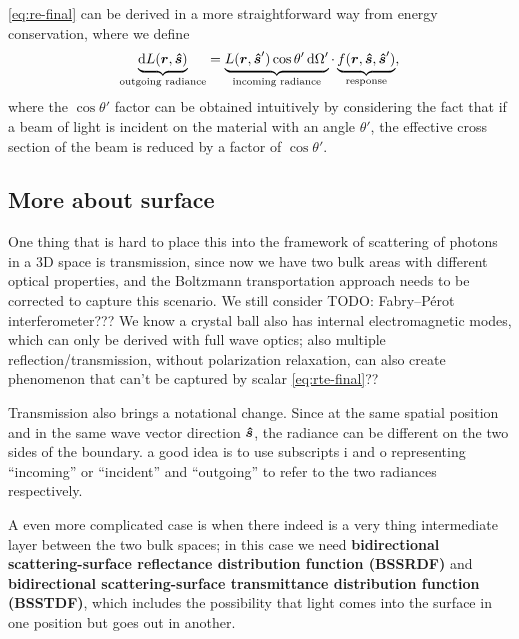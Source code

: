 \documentclass[hyperref, a4paper]{article}
\newcommand*{\concept}[1]{{\textbf{#1}}}
\begin{document}
\eqref{eq:re-final} can be derived in a more straightforward way 
from energy conservation, 
where we define 
\begin{equation}
    \underbrace{\dd{L(\vb*{r}, \vu*{s})}}_{\text{outgoing radiance}} 
    = \underbrace{L(\vb*{r}, \vu*{s}') \cos \theta' \dd{\Omega'}}_{\text{incoming radiance}} 
    \cdot \underbrace{f(\vb*{r}, \vu*{s}, \vu*{s}')}_{\text{response}} ,
\end{equation}
where the $\cos \theta'$ factor can be obtained intuitively 
by considering the fact that if a beam of light 
is incident on the material with an angle $\theta'$, 
the effective cross section of the beam is reduced by a factor of $\cos \theta'$.

\subsection{More about surface}


One thing that is hard to place this into the framework 
of scattering of photons in a 3D space
is transmission, 
since now we have two bulk areas with different optical properties,
and the Boltzmann transportation approach needs to be corrected 
to capture this scenario.
We still consider TODO: Fabry–Pérot interferometer??? We know a crystal ball also has internal electromagnetic modes, which can only be derived with full wave optics; 
also multiple reflection/transmission, 
without polarization relaxation,
can also create phenomenon that can't be captured by scalar \eqref{eq:rte-final}??

Transmission also brings a notational change. 
Since at the same spatial position and in the same wave vector direction $\vu*{s}$,
the radiance can be different 
on the two sides of the boundary.
a good idea is to use subscripts i and o
representing ``incoming'' or ``incident''
and ``outgoing'' to refer to the two radiances respectively.

A even more complicated case is when there indeed is 
a very thing intermediate layer between the two bulk spaces; 
in this case we need \concept{bidirectional scattering-surface reflectance distribution function (BSSRDF)}
and \concept{bidirectional scattering-surface transmittance distribution function (BSSTDF)},
which includes the possibility that light comes into the surface in one position 
but goes out in another.
\end{document}
